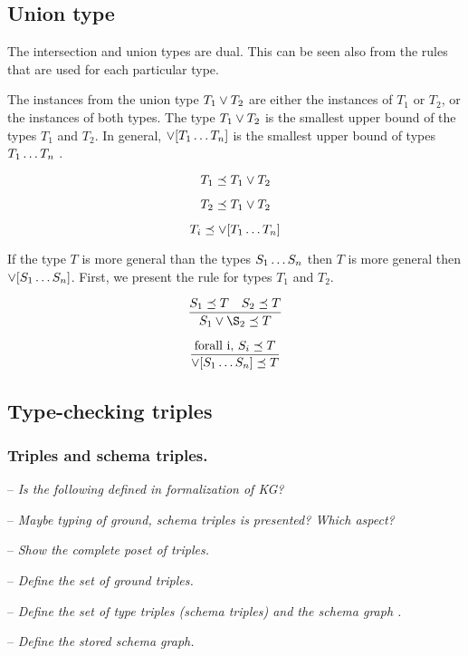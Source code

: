 \documentclass[runningheads]{llncs}
\newcommand{\nl}{\hfill\break}
\newcommand{\notes}[1]{\noindent\begin{small}-- \emph{#1}\\\end{small}}
\begin{document}
\subsection{Union type}

The intersection and union types are dual. This can be seen also from
the rules that are used for each particular type.

The instances from the union type $T_1\lor\/T_2$ are either the
instances of $T_1$ or $T_2$, or the instances of both types. The type
$T_1\lor\/T_2$ is the smallest upper bound of the types $T_1$ and
$T_2$. In general, $\lor[T_1\ldots\/T_n]$ is the smallest upper bound
of types $T_1\ldots\/T_n$ \cite{Pierce90CalculusIntersectUnion}.

\begin{equation}
T_1\preceq\/T_1\lor\/T_2    
\end{equation}

\begin{equation}
T_2\preceq\/T_1\lor\/T_2  
\end{equation}

\begin{equation}
T_i\preceq\/\lor[T_1\ldots\/T_n]  
\end{equation}

If the type $T$ is more general than the types $S_1\ldots\/S_n$ then
$T$ is more general then $\lor[S_1\ldots\/S_n]$. First, we present
the rule for types $T_1$ and $T_2$.

\begin{equation}
\dfrac{S_1\preceq\/T\quad\/S_2\preceq\/\/T}
      {S_1\lor\S_2\preceq\/T}  
\end{equation}

\begin{equation}
\dfrac{\text{forall i,\ } S_i\preceq\/T}
      {\lor[S_1\ldots\/S_n]\preceq\/T}  
\end{equation}



\subsection{Type-checking triples}

\subsubsection{Triples and schema triples.}\nl

\notes{Is the following defined in formalization of KG?}
\notes{Maybe typing of ground, schema triples is presented? Which aspect?}
\notes{Show the complete poset of triples.}
\notes{Define the set of ground triples.}
\notes{Define the set of type triples (schema triples) and the schema graph .}
\notes{Define the stored schema graph.}
\end{document}

